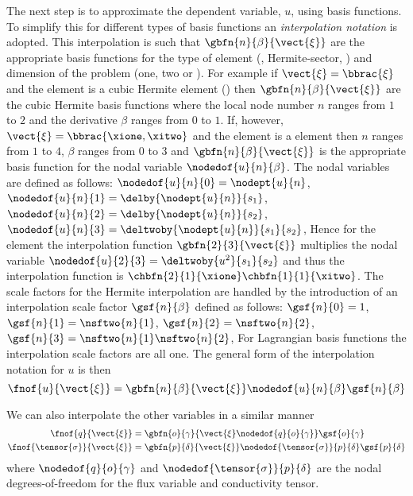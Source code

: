 The next step is to approximate the dependent variable, $u$, using basis
functions. To simplify this for different types of basis functions an
\emph{interpolation notation} is adopted. This interpolation is such that
$\gbfn{n}{\beta}{\vect{\xi}}$ are the appropriate basis functions for the
type of element (\eg \bicubicherm, Hermite-sector, \etc) and dimension of 
the problem (one, two or \threedal). For example if $\vect{\xi}=\bbrac{\xi}$ 
and the element is a cubic Hermite element
() then $\gbfn{n}{\beta}{\vect{\xi}}$ 
are the cubic Hermite basis functions where the local node number $n$ ranges 
from $1$ to $2$ and the derivative $\beta$ ranges from $0$ to $1$. If,
however, $\vect{\xi}=\bbrac{\xione,\xitwo}$ and the element is a \bicubicherm 
element then $n$ ranges from $1$ to $4$, $\beta$ ranges from $0$ to $3$ and
$\gbfn{n}{\beta}{\vect{\xi}}$ is the appropriate basis function for the nodal
variable $\nodedof{u}{n}{\beta}$. The nodal variables are defined as
follows: $\nodedof{u}{n}{0}=\nodept{u}{n}$,
$\nodedof{u}{n}{1}=\delby{\nodept{u}{n}}{s_{1}}$,
$\nodedof{u}{n}{2}=\delby{\nodept{u}{n}}{s_{2}}$,
$\nodedof{u}{n}{3}=\deltwoby{\nodept{u}{n}}{s_{1}}{s_{2}}$,
\etc Hence for the \bicubicherm element the interpolation function
$\gbfn{2}{3}{\vect{\xi}}$ multiplies the nodal variable
$\nodedof{u}{2}{3}=\deltwoby{u^{2}}{s_{1}}{s_{2}}$ and thus the
interpolation function is $\chbfn{2}{1}{\xione}\chbfn{1}{1}{\xitwo}$.  The
scale factors for the Hermite interpolation are handled by the introduction of
an interpolation scale factor $\gsf{n}{\beta}$ defined as follows:
$\gsf{n}{0}=1$, $\gsf{n}{1}=\nsftwo{n}{1}$, $\gsf{n}{2}=
\nsftwo{n}{2}$, $\gsf{n}{3}=\nsftwo{n}{1}\nsftwo{n}{2}$,
\etc For Lagrangian basis functions the interpolation scale factors are all
one. The general form of the interpolation notation for $u$ is then
\begin{equation}
  \fnof{u}{\vect{\xi}}=\gbfn{n}{\beta}{\vect{\xi}}\nodedof{u}{n}{\beta}\gsf{n}{\beta}
  \label{eqn:uinterpolation}
\end{equation}

We can also interpolate the other variables in a similar manner \ie
\begin{equation}
  \begin{split}
    \fnof{q}{\vect{\xi}} &= \gbfn{o}{\gamma}{\vect{\xi}\nodedof{q}{o}{\gamma}}
    \gsf{o}{\gamma} \\
    \fnof{\tensor{\sigma}}{\vect{\xi}}
    &=\gbfn{p}{\delta}{\vect{\xi}}\nodedof{\tensor{\sigma}}{p}{\delta}\gsf{p}{\delta} \\
  \end{split}
\end{equation}
where $\nodedof{q}{o}{\gamma}$ and $\nodedof{\tensor{\sigma}}{p}{\delta}$ are the
nodal degrees-of-freedom for the flux variable and conductivity tensor.

